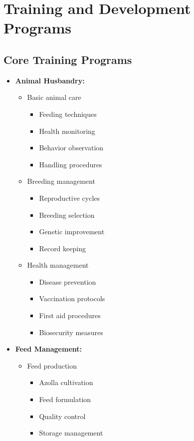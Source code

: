 \section{Training and Development Programs}

\subsection{Core Training Programs}
\begin{itemize}
    \item \textbf{Animal Husbandry:}
    \begin{itemize}
        \item Basic animal care
        \begin{itemize}
            \item Feeding techniques
            \item Health monitoring
            \item Behavior observation
            \item Handling procedures
        \end{itemize}
        
        \item Breeding management
        \begin{itemize}
            \item Reproductive cycles
            \item Breeding selection
            \item Genetic improvement
            \item Record keeping
        \end{itemize}
        
        \item Health management
        \begin{itemize}
            \item Disease prevention
            \item Vaccination protocols
            \item First aid procedures
            \item Biosecurity measures
        \end{itemize}
    \end{itemize}
    
    \item \textbf{Feed Management:}
    \begin{itemize}
        \item Feed production
        \begin{itemize}
            \item Azolla cultivation
            \item Feed formulation
            \item Quality control
            \item Storage management
        \end{itemize}
        

\end{itemize}
\end{itemize}
